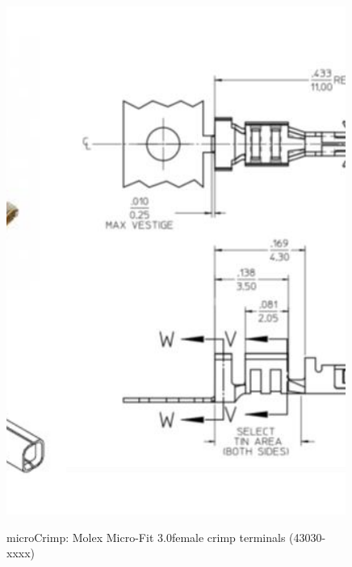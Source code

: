 \begin{figure}
  \centering
  \includegraphics[angle=90,width=1\columnwidth]{figs/body02/FIGDEVICEmicroCrimp.pdf}\\
  \caption[microCrimp: Molex Micro-Fit 3.0\texttrademark female crimp terminals (43030-xxxx)]{microCrimp: Molex Micro-Fit 3.0\texttrademark female crimp terminals (43030-xxxx)}
  \label{FIG:DEVICEmicroCrimp}
\end{figure}

